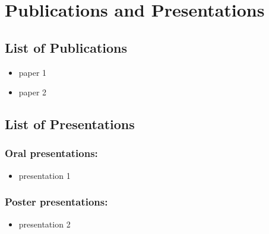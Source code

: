 \chapter{Publications and Presentations}

\section*{List of Publications}
 
\begin{itemize}
    \item paper 1
    \item paper 2
\end{itemize}

\section*{List of Presentations}

\subsection*{Oral presentations:} 

\begin{itemize}
\item presentation 1
\end{itemize}

\subsection*{Poster presentations:}

\begin{itemize}
    \item presentation 2
\end{itemize}

